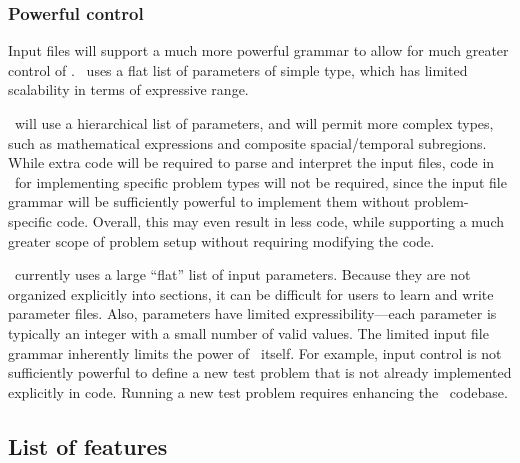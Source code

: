 \documentclass{article}
\begin{document}
    \subsubsection{Powerful control}  

    Input files will support a much more powerful grammar to allow for
    much greater control of \cello.  \enzo\ uses a flat list of
    parameters of simple type, which has limited scalability in terms
    of expressive range.

    \cello\ will use a hierarchical list of parameters, and will
    permit more complex types, such as mathematical expressions and
    composite spacial/temporal subregions.  While extra code will be
    required to parse and interpret the input files, code in \enzo\
    for implementing specific problem types will not be required, since
    the input file grammar will be sufficiently powerful to
    implement them without problem-specific code.  Overall, this may
    even result in less code, while supporting a much greater
    scope of problem setup without requiring modifying the code.
    


% 
    \enzo\ currently uses a large ``flat'' list of input parameters.
    Because they are not organized explicitly into sections, it can be
    difficult for users to learn and write parameter files.
%
    Also, parameters have limited expressibility---each parameter is
    typically an integer with a small number of valid values.
%
    The limited input file grammar inherently limits the power of
    \enzo\ itself.  For example, input control is not sufficiently
    powerful to define a new test problem that is not already
    implemented explicitly in code.  Running a new test problem
    requires enhancing the \enzo\ codebase.


\subsection{List of features}
\end{document}

